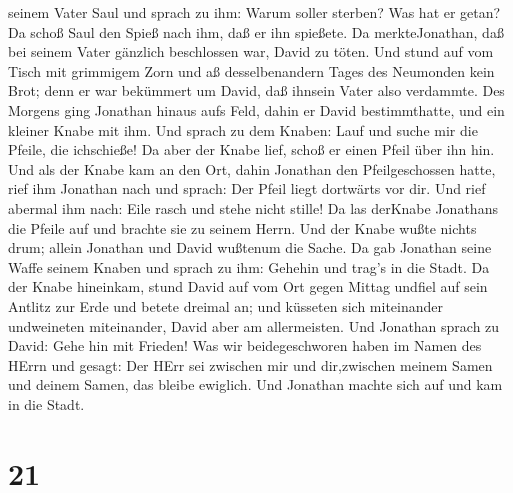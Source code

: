seinem Vater Saul und sprach zu ihm: Warum soller sterben? Was hat er
getan?  Da schoß Saul den Spieß nach ihm, daß er ihn
spießete. Da merkteJonathan, daß bei seinem Vater gänzlich beschlossen
war, David zu töten.  Und stund auf vom Tisch mit grimmigem
Zorn und aß desselbenandern Tages des Neumonden kein Brot; denn er war
bekümmert um David, daß ihnsein Vater also verdammte.  Des
Morgens ging Jonathan hinaus aufs Feld, dahin er David bestimmthatte,
und ein kleiner Knabe mit ihm.  Und sprach zu dem Knaben:
Lauf und suche mir die Pfeile, die ichschieße! Da aber der Knabe lief,
schoß er einen Pfeil über ihn hin.  Und als der Knabe kam
an den Ort, dahin Jonathan den Pfeilgeschossen hatte, rief ihm Jonathan
nach und sprach: Der Pfeil liegt dortwärts vor dir.  Und
rief abermal ihm nach: Eile rasch und stehe nicht stille! Da las
derKnabe Jonathans die Pfeile auf und brachte sie zu seinem Herrn.
 Und der Knabe wußte nichts drum; allein Jonathan und David
wußtenum die Sache.  Da gab Jonathan seine Waffe seinem
Knaben und sprach zu ihm: Gehehin und trag's in die Stadt. 
Da der Knabe hineinkam, stund David auf vom Ort gegen Mittag undfiel auf
sein Antlitz zur Erde und betete dreimal an; und küsseten sich
miteinander undweineten miteinander, David aber am allermeisten.
 Und Jonathan sprach zu David: Gehe hin mit Frieden! Was
wir beidegeschworen haben im Namen des HErrn und gesagt: Der HErr sei
zwischen mir und dir,zwischen meinem Samen und deinem Samen, das bleibe
ewiglich.  Und Jonathan machte sich auf und kam in die
Stadt.

\hypertarget{section-20}{%
\section{21}\label{section-20}}

